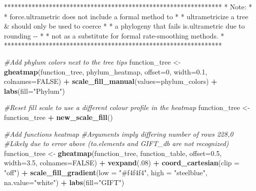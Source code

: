 \documentclass[
]{book}
\newenvironment{Shaded}{\begin{snugshade}}{\end{snugshade}}
\newcommand{\AttributeTok}[1]{\textcolor[rgb]{0.13,0.29,0.53}{#1}}
\newcommand{\CommentTok}[1]{\textcolor[rgb]{0.56,0.35,0.01}{\textit{#1}}}
\newcommand{\ConstantTok}[1]{\textcolor[rgb]{0.56,0.35,0.01}{#1}}
\newcommand{\DecValTok}[1]{\textcolor[rgb]{0.00,0.00,0.81}{#1}}
\newcommand{\FloatTok}[1]{\textcolor[rgb]{0.00,0.00,0.81}{#1}}
\newcommand{\FunctionTok}[1]{\textcolor[rgb]{0.13,0.29,0.53}{\textbf{#1}}}
\newcommand{\NormalTok}[1]{#1}
\newcommand{\OtherTok}[1]{\textcolor[rgb]{0.56,0.35,0.01}{#1}}
\newcommand{\SpecialCharTok}[1]{\textcolor[rgb]{0.81,0.36,0.00}{\textbf{#1}}}
\newcommand{\StringTok}[1]{\textcolor[rgb]{0.31,0.60,0.02}{#1}}
\begin{document}
\begin{Shaded}
\begin{Highlighting}[]
\NormalTok{***************************************************************}
\NormalTok{*                          Note:                              *}
\NormalTok{*    force.ultrametric does not include a formal method to    *}
\NormalTok{*    ultrametricize a tree \& should only be used to coerce    *}
\NormalTok{*   a phylogeny that fails is.ultrametric due to rounding {-}{-}  *}
\NormalTok{*    not as a substitute for formal rate{-}smoothing methods.   *}
\NormalTok{***************************************************************}
\end{Highlighting}
\end{Shaded}

\begin{Shaded}
\begin{Highlighting}[]
\CommentTok{\#Add phylum colors next to the tree tips}
\NormalTok{function\_tree }\OtherTok{\textless{}{-}} \FunctionTok{gheatmap}\NormalTok{(function\_tree, phylum\_heatmap, }\AttributeTok{offset=}\DecValTok{0}\NormalTok{, }\AttributeTok{width=}\FloatTok{0.1}\NormalTok{, }\AttributeTok{colnames=}\ConstantTok{FALSE}\NormalTok{) }\SpecialCharTok{+}
            \FunctionTok{scale\_fill\_manual}\NormalTok{(}\AttributeTok{values=}\NormalTok{phylum\_colors) }\SpecialCharTok{+}
            \FunctionTok{labs}\NormalTok{(}\AttributeTok{fill=}\StringTok{"Phylum"}\NormalTok{)}

\CommentTok{\#Reset fill scale to use a different colour profile in the heatmap}
\NormalTok{function\_tree }\OtherTok{\textless{}{-}}\NormalTok{ function\_tree }\SpecialCharTok{+} \FunctionTok{new\_scale\_fill}\NormalTok{()}

\CommentTok{\#Add functions heatmap}
\CommentTok{\#Arguments imply differing number of rows 228,0}
\CommentTok{\#Likely due to error above (to.elements and GIFT\_db are not recognized)}
\NormalTok{function\_tree }\OtherTok{\textless{}{-}} \FunctionTok{gheatmap}\NormalTok{(function\_tree, function\_table, }\AttributeTok{offset=}\FloatTok{0.5}\NormalTok{, }\AttributeTok{width=}\FloatTok{3.5}\NormalTok{, }\AttributeTok{colnames=}\ConstantTok{FALSE}\NormalTok{) }\SpecialCharTok{+}
            \FunctionTok{vexpand}\NormalTok{(.}\DecValTok{08}\NormalTok{) }\SpecialCharTok{+}
            \FunctionTok{coord\_cartesian}\NormalTok{(}\AttributeTok{clip =} \StringTok{"off"}\NormalTok{) }\SpecialCharTok{+}
            \FunctionTok{scale\_fill\_gradient}\NormalTok{(}\AttributeTok{low =} \StringTok{"\#f4f4f4"}\NormalTok{, }\AttributeTok{high =} \StringTok{"steelblue"}\NormalTok{, }\AttributeTok{na.value=}\StringTok{"white"}\NormalTok{) }\SpecialCharTok{+}
            \FunctionTok{labs}\NormalTok{(}\AttributeTok{fill=}\StringTok{"GIFT"}\NormalTok{)}


\end{Highlighting}
\end{Shaded}
\end{document}
